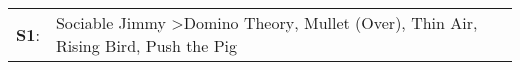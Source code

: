 \begin{supertabular}{p{0.03\textwidth}p{0.92\textwidth}}
 \textbf{S1}:  &  Sociable Jimmy\textsuperscript{} \textgreater \enspace Domino Theory\textsuperscript{}, \enspace Mullet (Over)\textsuperscript{}, \enspace Thin Air\textsuperscript{}, \enspace Rising Bird\textsuperscript{}, \enspace Push the Pig\textsuperscript{}  \enspace  \\
\end{supertabular}
